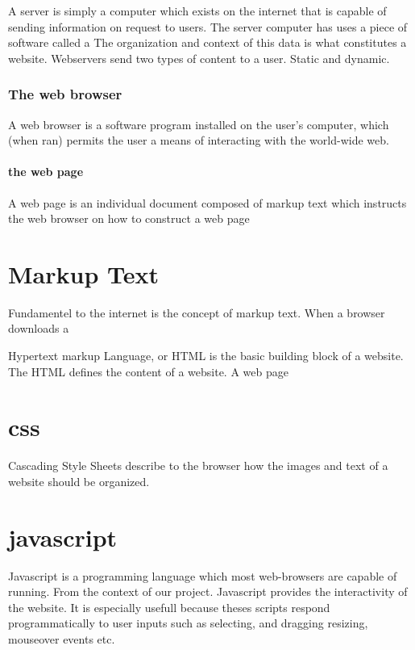 A server is simply a computer which exists on the internet that is capable of sending information on request to users.  The server computer has uses a piece of software called a   The organization and context of this data is what constitutes a website.  Webservers send two types of content to a user.  Static and dynamic.

\subsection{The web browser}

A web browser is a software program installed on the user's computer, which (when ran) permits the user a means of interacting with the world-wide web.  


\subsubsection{the web page}

A web page is an individual document composed of markup text which instructs the web browser on how to construct a web page

\chapter{Markup Text}

Fundamentel to the internet is the concept of markup text.  When a browser downloads a 

Hypertext markup Language, or HTML is the basic building block of a website.  The HTML defines the content of a website.  A web page 

\chapter{css}

Cascading Style Sheets describe to the browser how the images and text of a website should be organized.  

\chapter{javascript}

Javascript is a programming language which most web-browsers are capable of running.  From the context of our project.  Javascript provides the interactivity of the website.  It is especially usefull because theses scripts respond programmatically to user inputs such as selecting, and dragging resizing, mouseover events etc.

